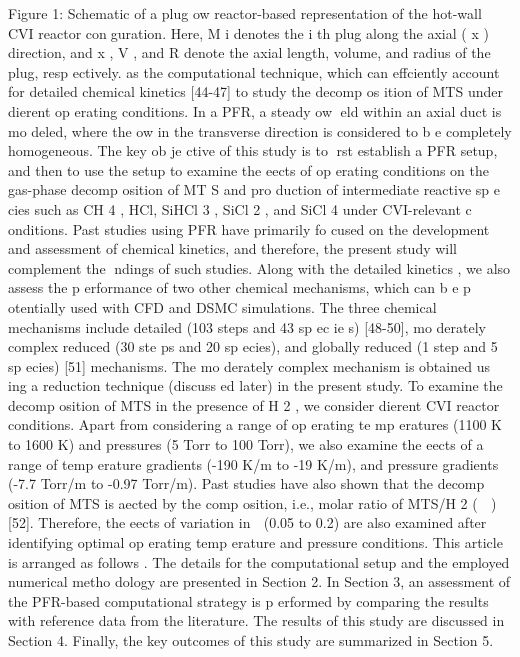 \documentclass[10pt, letterpaper]{article}
\begin{document}
Figure 1: Schematic of a plug 
ow reactor-based representation of the hot-wall CVI reactor conguration. Here,
M
i
denotes the
i
th
plug along the axial (
x
) direction, and 
x
, 
V
, and
R
denote the axial length, volume, and radius of the plug, resp ectively.
as the computational technique, which can effciently account for detailed chemical kinetics [44-47] to study
the decomp os ition of MTS under dierent op erating conditions. In a PFR, a steady 
ow eld within an axial
duct is mo deled, where the 
ow in the transverse direction is considered to b e completely homogeneous.
The key ob je ctive of this study is to rst establish a PFR setup, and then to use the setup to examine
the eects of op erating conditions on the gas-phase decomp osition of MT S and pro duction of intermediate
reactive sp e cies such as CH
4
, HCl, SiHCl
3
, SiCl
2
, and SiCl
4
under CVI-relevant c onditions. Past studies
using PFR have primarily fo cused on the development and assessment of chemical kinetics, and therefore,
the present study will complement the ndings of such studies. Along with the detailed kinetics , we also
assess the p erformance of two other chemical mechanisms, which can b e p otentially used with CFD and
DSMC simulations. The three chemical mechanisms include detailed (103 steps and 43 sp ec ie s) [48-50],
mo derately complex reduced (30 ste ps and 20 sp ecies), and globally reduced (1 step and 5 sp ecies) [51]
mechanisms. The mo derately complex mechanism is obtained us ing a reduction technique (discuss ed later)
in the present study. To examine the decomp osition of MTS in the presence of H
2
, we consider dierent
CVI reactor conditions. Apart from considering a range of op erating te mp eratures (1100 K to 1600 K) and
pressures (5 Torr to 100 Torr), we also examine the eects of a range of temp erature gradients (-190 K/m
to -19 K/m), and pressure gradients (-7.7 Torr/m to -0.97 Torr/m). Past studies have also shown that the
decomp osition of MTS is aected by the comp osition, i.e., molar ratio of MTS/H
2
(

) [52]. Therefore, the
eects of variation in

(0.05 to 0.2) are also examined after identifying optimal op erating temp erature and
pressure conditions.
This article is arranged as follows . The details for the computational setup and the employed numerical
metho dology are presented in Section 2. In Section 3, an assessment of the PFR-based computational
strategy is p erformed by comparing the results with reference data from the literature. The results of this
study are discussed in Section 4. Finally, the key outcomes of this study are summarized in Section 5.
\end{document}

